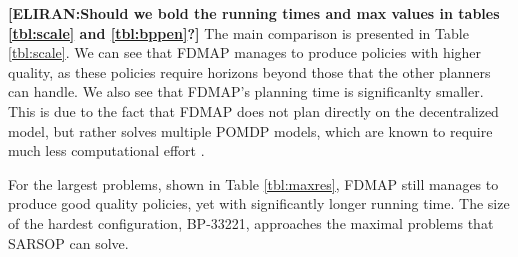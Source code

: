 \documentclass[letterpaper]{article} %
\theoremstyle{definition}
\newcommand{\eliran}[1]{\textbf{[\color{red}ELIRAN:#1]}}
\newcommand{\guy}[1]{\textbf{[\color{orange}GUY:#1]}}
\begin{document}
\begin{table}
\centering
\scriptsize
    \caption{\label{tbl:small} Results for BP-21210. FDMAP outputs a reasonable value compared to GMAA-ICE, which most likely optimizes the small scaled problem. The last row presents results for the maximal horizon, which is specified in parentheses alongside the policy value.}
\end{table}


\eliran{Should we bold the running times and max values in tables \ref{tbl:scale} and \ref{tbl:bppen}?}
The main comparison is presented in Table \ref{tbl:scale}. We can see that FDMAP manages to produce policies with higher quality, as these policies require horizons beyond those that the other planners can handle. We also see that FDMAP's planning time is significanlty smaller.
 This is due to the fact that FDMAP does not plan directly on the decentralized model, but rather solves multiple POMDP models, which are known to require much less computational effort \cite{DECPOMDPCOMP}.

For the largest problems, shown in Table \ref{tbl:maxres}, FDMAP still manages to produce good quality policies, yet with significantly longer running time. The size of the hardest configuration, BP-33221, approaches the maximal problems that SARSOP \cite{SARSOP} can solve.
\end{document}
